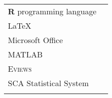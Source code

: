 \documentclass[11pt]{article}\usepackage[]{graphicx}\usepackage[]{color}
\begin{document}
\begin{tabular}{ll}
\textbf{\textsf{R}} programming language\\
{\LaTeX}\\
Microsoft Office\\
\textsc{MATLAB}\\
\textsc{Eviews}\\
SCA Statistical System\\
&
\end{tabular}


% 
% 
% 
% 
% 
\end{document}
